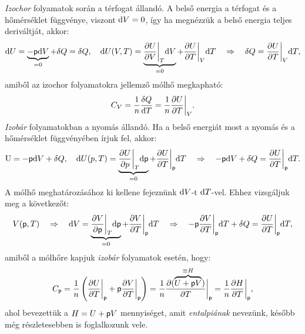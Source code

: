 \emph{Izochor} folyamatok során a térfogat állandó. 
A belső energia a térfogat és a hőmérséklet függvénye, viszont $\mathrm{d}V=0$, így ha megnézzük a belső energia teljes deriváltját, akkor:
\begin{align}\label{eq:izochor_U}
    \mathrm{d}U = \underbrace{-\mathsf p\mathrm{d}V}_{=0}+\delta Q = \delta Q,\quad \mathrm{d}U(V,T) = \underbrace{\frac{\partial{U}}{\partial{V}}\bigg|_T\mathrm{d}V}_{=0} + \frac{\partial{U}}{\partial{T}}\bigg|_V\mathrm{d}T \quad\Rightarrow\quad \delta Q = \frac{\partial{U}}{\partial{T}}\bigg|_V\mathrm{d}T,
\end{align}
amiből az izochor folyamatokra jellemző mólhő megkapható:
\begin{align}
     C_V = \frac{1}{n} \frac{\delta Q}{\mathrm{d}T} = \frac{1}{n} \frac{\partial{U}}{\partial{T}}\bigg|_V.
\end{align}
\emph{Izobár} folyamatokban a nyomás állandó. Ha a belső energiát most a nyomás és a hőmérséklet függvényében írjuk fel, akkor:
\begin{align}
    \mathrm{U} = -\mathsf p\mathrm{d}V+\delta Q,\quad \mathrm{d}U(p,T) = \underbrace{\frac{\partial{U}}{\partial{p}}\bigg|_T \mathrm{d}\mathsf p}_{=0} + \frac{\partial{U}}{\partial{T}}\bigg|_\mathsf p \mathrm{d}T \quad\Rightarrow\quad -\mathsf p\mathrm{d}V +\delta Q = \frac{\partial{U}}{\partial{T}}\bigg|_\mathsf p \mathrm{d}T.
\end{align}
A mólhő meghatározásához ki kellene fejeznünk $\mathrm{d}V$-t $\mathrm{d}T$-vel. Ehhez vizsgáljuk meg a következőt:
\begin{align}
    V(\mathsf p,T) \quad\Rightarrow\quad \mathrm{d}V = \underbrace{\frac{\partial{V}}{\partial{\mathsf p}}\bigg|_T\mathrm{d}\mathsf p}_{=0} + \frac{\partial{V}}{\partial{T}}\bigg|_\mathsf p \mathrm{d}T \quad\Rightarrow\quad -\mathsf p\frac{\partial{V}}{\partial{T}}\bigg|_\mathsf p \mathrm{d}T +\delta Q = \frac{\partial{U}}{\partial{T}}\bigg|_\mathsf p \mathrm{d}T,
\end{align}
amiből a mólhőre kapjuk \emph{izobár} folyamatok esetén, hogy:
\begin{align}
    C_\mathsf p = \frac{1}{n}\left({\frac{\partial{U}}{\partial{T}}\bigg|_\mathsf p + \mathsf p \frac{\partial{V}}{\partial{T}}\bigg|_\mathsf p}\right) = \frac{1}{n} \frac{\partial(\overbrace{U+\mathsf p V}^{\equiv H})}{\partial T}\bigg|_\mathsf p =\frac{1}{n}\frac{\partial{H}}{\partial{T}}\bigg|_\mathsf p,
\end{align}
ahol bevezettük a $H=U+\mathsf p V$ mennyiséget, amit \emph{entalpiának} nevezünk, később még részletesebben is foglalkozunk vele.

